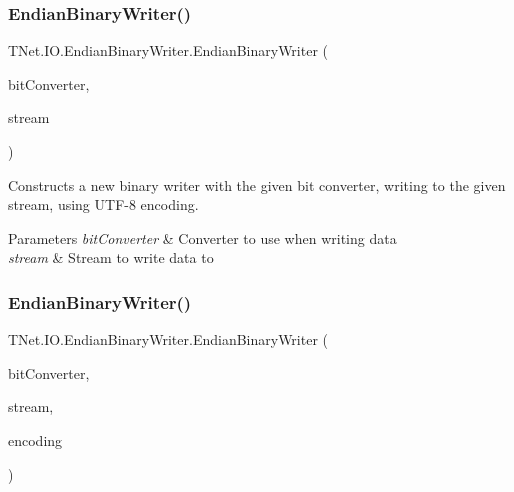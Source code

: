 \subsubsection{\texorpdfstring{Endian\+Binary\+Writer()}{EndianBinaryWriter()}\hspace{0.1cm}{\footnotesize\ttfamily [1/2]}}
{\footnotesize\ttfamily T\+Net.\+I\+O.\+Endian\+Binary\+Writer.\+Endian\+Binary\+Writer (\begin{DoxyParamCaption}\item[{\mbox{\hyperlink{class_t_net_1_1_i_o_1_1_endian_bit_converter}{Endian\+Bit\+Converter}}}]{bit\+Converter,  }\item[{Stream}]{stream }\end{DoxyParamCaption})}



Constructs a new binary writer with the given bit converter, writing to the given stream, using U\+T\+F-\/8 encoding. 


\begin{DoxyParams}{Parameters}
{\em bit\+Converter} & Converter to use when writing data\\
\hline
{\em stream} & Stream to write data to\\
\hline
\end{DoxyParams}
\mbox{\label{class_t_net_1_1_i_o_1_1_endian_binary_writer_acd0e9fbe6e0482fc70983ebfcee982b7}} 
\subsubsection{\texorpdfstring{Endian\+Binary\+Writer()}{EndianBinaryWriter()}\hspace{0.1cm}{\footnotesize\ttfamily [2/2]}}
{\footnotesize\ttfamily T\+Net.\+I\+O.\+Endian\+Binary\+Writer.\+Endian\+Binary\+Writer (\begin{DoxyParamCaption}\item[{\mbox{\hyperlink{class_t_net_1_1_i_o_1_1_endian_bit_converter}{Endian\+Bit\+Converter}}}]{bit\+Converter,  }\item[{Stream}]{stream,  }\item[{\mbox{\hyperlink{class_t_net_1_1_i_o_1_1_endian_binary_writer_a0148eabc0f952c96b0a43d364c60c03b}{Encoding}}}]{encoding }\end{DoxyParamCaption})}



